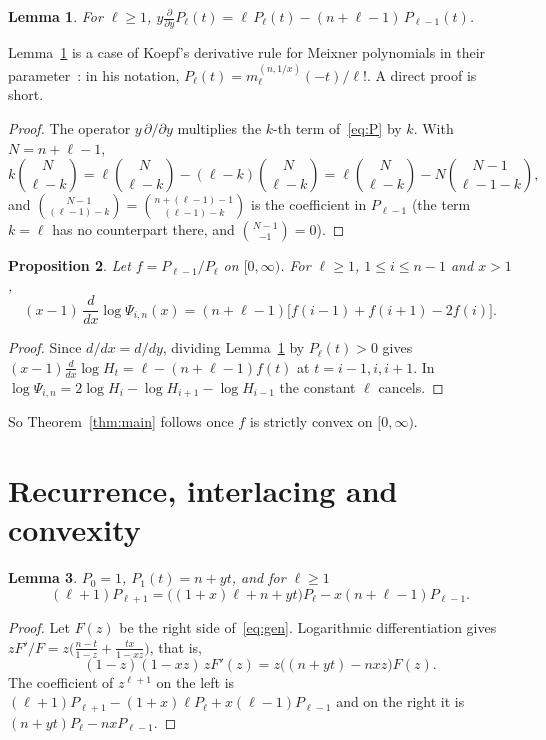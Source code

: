 \documentclass[11pt]{amsart}
\newtheorem{lemma}{Lemma}
\newtheorem{proposition}[lemma]{Proposition}
\theoremstyle{remark}
\begin{document}
\begin{lemma}\label{lem:deriv}
For $\ell\ge1$, $\displaystyle y\frac{\partial}{\partial y}P_\ell(t)=\ell\,P_\ell(t)-(n+\ell-1)\,P_{\ell-1}(t)$.
\end{lemma}

\noindent Lemma~\ref{lem:deriv} is a case of Koepf's derivative rule for Meixner polynomials in their parameter~\cite[Theorem~9]{Koepf}: in his notation, $P_\ell(t)=m_\ell^{(n,1/x)}(-t)/\ell!$. A direct proof is short.

\begin{proof}
The operator $y\,\partial/\partial y$ multiplies the $k$-th term of~\eqref{eq:P} by $k$. With $N=n+\ell-1$,
\[
k\binom{N}{\ell-k}=\ell\binom{N}{\ell-k}-(\ell-k)\binom{N}{\ell-k}=\ell\binom{N}{\ell-k}-N\binom{N-1}{\ell-1-k},
\]
and $\binom{N-1}{(\ell-1)-k}=\binom{n+(\ell-1)-1}{(\ell-1)-k}$ is the coefficient in $P_{\ell-1}$ (the term $k=\ell$ has no counterpart there, and $\binom{N-1}{-1}=0$).
\end{proof}

\begin{proposition}\label{prop:red}
Let $f=P_{\ell-1}/P_\ell$ on $[0,\infty)$. For $\ell\ge1$, $1\le i\le n-1$ and $x>1$,
\[
(x-1)\,\frac{d}{dx}\log\Psi_{i,n}(x)=(n+\ell-1)\bigl[f(i-1)+f(i+1)-2f(i)\bigr].
\]
\end{proposition}

\begin{proof}
Since $d/dx=d/dy$, dividing Lemma~\ref{lem:deriv} by $P_\ell(t)>0$ gives $(x-1)\frac{d}{dx}\log H_t=\ell-(n+\ell-1)f(t)$ at $t=i-1,i,i+1$. In $\log\Psi_{i,n}=2\log H_i-\log H_{i+1}-\log H_{i-1}$ the constant $\ell$ cancels.
\end{proof}

So Theorem~\ref{thm:main} follows once $f$ is strictly convex on $[0,\infty)$.

\section{Recurrence, interlacing and convexity}\label{sec:zeros}

\begin{lemma}\label{lem:rec}
$P_0=1$, $P_1(t)=n+yt$, and for $\ell\ge1$
\begin{equation}\label{eq:rec}
(\ell+1)P_{\ell+1}=\bigl((1+x)\ell+n+yt\bigr)P_\ell-x(n+\ell-1)P_{\ell-1}.
\end{equation}
\end{lemma}

\begin{proof}
Let $F(z)$ be the right side of~\eqref{eq:gen}. Logarithmic differentiation gives $zF'/F=z\bigl(\tfrac{n-t}{1-z}+\tfrac{tx}{1-xz}\bigr)$, that is,
\[
(1-z)(1-xz)\,zF'(z)=z\bigl((n+yt)-nxz\bigr)F(z).
\]
The coefficient of $z^{\ell+1}$ on the left is $(\ell+1)P_{\ell+1}-(1+x)\ell P_\ell+x(\ell-1)P_{\ell-1}$ and on the right it is $(n+yt)P_\ell-nxP_{\ell-1}$.
\end{proof}
\end{document}
